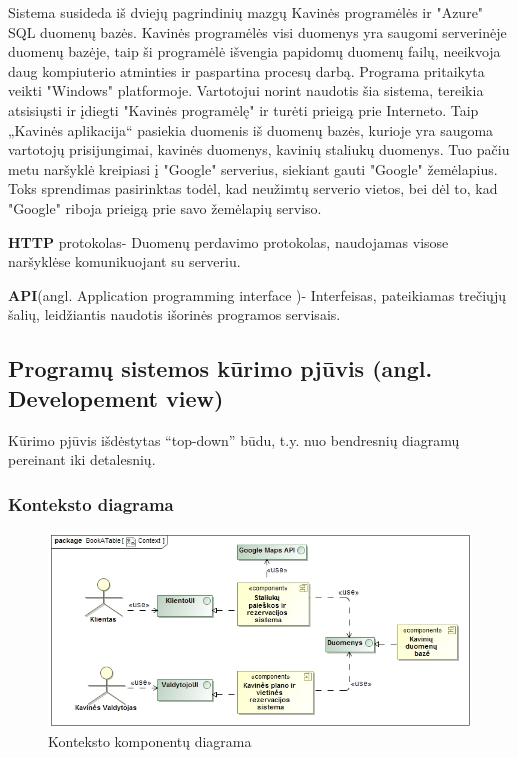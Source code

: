 \documentclass{VUMIFPSkursinis}
\begin{document}
Sistema susideda iš dviejų pagrindinių mazgų Kavinės programėlės ir "Azure" SQL duomenų bazės. Kavinės programėlės visi duomenys yra saugomi serverinėje duomenų bazėje, taip ši programėlė išvengia papidomų duomenų failų, neeikvoja daug kompiuterio atminties ir paspartina procesų darbą. Programa pritaikyta veikti "Windows" platformoje. Vartotojui norint naudotis šia sistema, tereikia atsisiųsti ir įdiegti "Kavinės programėlę" ir turėti prieigą prie Interneto. Taip „Kavinės aplikacija“ pasiekia duomenis iš duomenų bazės, kurioje yra saugoma vartotojų prisijungimai, kavinės duomenys, kavinių staliukų duomenys. Tuo pačiu metu naršyklė kreipiasi į "Google" serverius, siekiant gauti "Google" žemėlapius. Toks sprendimas pasirinktas todėl, kad neužimtų serverio vietos, bei dėl to, kad "Google" riboja prieigą prie savo žemėlapių serviso. 

\textbf{HTTP} protokolas- Duomenų perdavimo protokolas, naudojamas visose naršyklėse komunikuojant su serveriu.

\textbf{API}(angl. Application programming interface )- Interfeisas, pateikiamas trečiųjų šalių, leidžiantis naudotis išorinės programos servisais.


\subsection{Programų sistemos kūrimo pjūvis (angl. Developement view)}
Kūrimo pjūvis išdėstytas “top-down” būdu, t.y. nuo bendresnių
diagramų pereinant iki detalesnių.

\subsubsection{Konteksto diagrama}

\begin {figure}[H]
	\includegraphics[width=\textwidth,height=\textheight,keepaspectratio]{img/Context}
	\caption{Konteksto komponentų diagrama}
	\label{fig:Context}
\end{figure}
\end{document}
